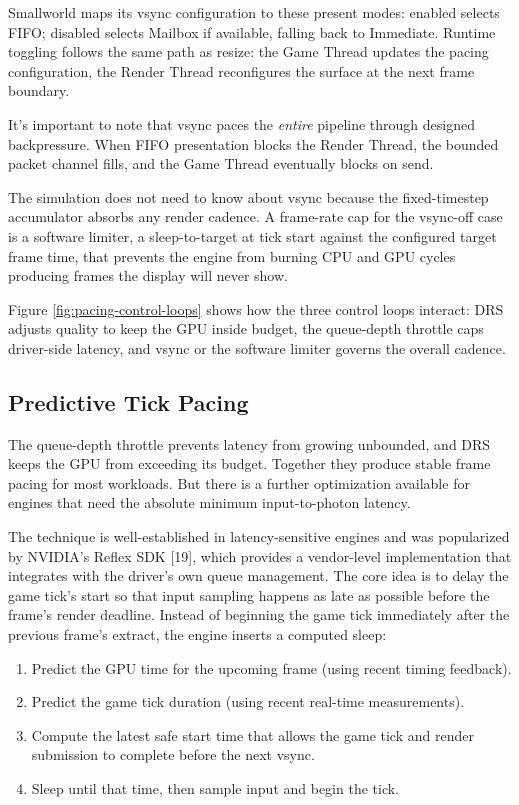 \documentclass[
  11pt,
  letterpaper,
  DIV=11,
  numbers=noendperiod,
  twoside,
  open=right]{scrreprt}
\providecommand{\tightlist}{%
  \setlength{\itemsep}{0pt}\setlength{\parskip}{0pt}}
\begin{document}
Smallworld maps its vsync configuration to these present modes: enabled
selects FIFO; disabled selects Mailbox if available, falling back to
Immediate. Runtime toggling follows the same path as resize: the Game
Thread updates the pacing configuration, the Render Thread reconfigures
the surface at the next frame boundary.

It's important to note that vsync paces the \emph{entire} pipeline
through designed backpressure. When FIFO presentation blocks the Render
Thread, the bounded packet channel fills, and the Game Thread eventually
blocks on send.

The simulation does not need to know about vsync because the
fixed-timestep accumulator absorbs any render cadence. A frame-rate cap
for the vsync-off case is a software limiter, a sleep-to-target at tick
start against the configured target frame time, that prevents the engine
from burning CPU and GPU cycles producing frames the display will never
show.

Figure \ref{fig:pacing-control-loops} shows how the three control loops
interact: DRS adjusts quality to keep the GPU inside budget, the
queue-depth throttle caps driver-side latency, and vsync or the software
limiter governs the overall cadence.



\subsection{Predictive Tick Pacing}\label{predictive-tick-pacing}

The queue-depth throttle prevents latency from growing unbounded, and
DRS keeps the GPU from exceeding its budget. Together they produce
stable frame pacing for most workloads. But there is a further
optimization available for engines that need the absolute minimum
input-to-photon latency.

The technique is well-established in latency-sensitive engines and was
popularized by NVIDIA's Reflex SDK {[}19{]}, which provides a
vendor-level implementation that integrates with the driver's own queue
management. The core idea is to delay the game tick's start so that
input sampling happens as late as possible before the frame's render
deadline. Instead of beginning the game tick immediately after the
previous frame's extract, the engine inserts a computed sleep:

\begin{enumerate}
\def\labelenumi{\arabic{enumi}.}
\tightlist
\item
  Predict the GPU time for the upcoming frame (using recent timing
  feedback).
\item
  Predict the game tick duration (using recent real-time measurements).
\item
  Compute the latest safe start time that allows the game tick and
  render submission to complete before the next vsync.
\item
  Sleep until that time, then sample input and begin the tick.
\end{enumerate}
\end{document}
